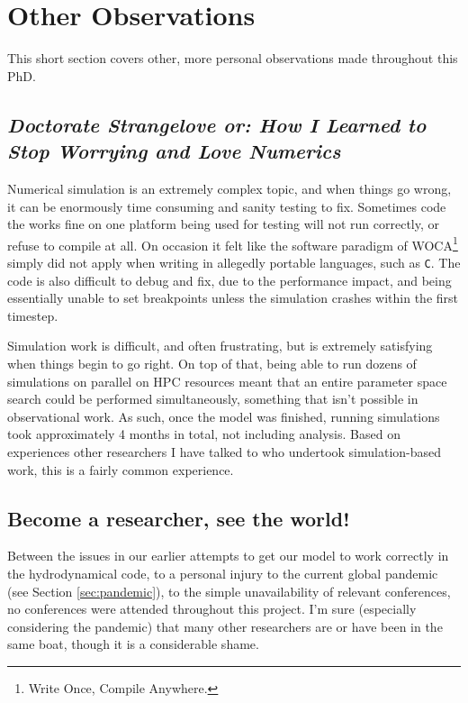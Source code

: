 \section{Other Observations}

This short section covers other, more personal observations made throughout this PhD.

\subsection[\textit{How I Learned to Stop Worrying and Love Numerics}]{\textit{Doctorate Strangelove or: How I Learned to Stop Worrying and Love Numerics}}

Numerical simulation is an extremely complex topic, and when things go wrong, it can be enormously time consuming and sanity testing to fix.
Sometimes code the works fine on one platform being used for testing will not run correctly, or refuse to compile at all.
On occasion it felt like the software paradigm of WOCA\footnote{Write Once, Compile Anywhere.} simply did not apply when writing in allegedly portable languages, such as \texttt{C}.
The code is also difficult to debug and fix, due to the performance impact, and being essentially unable to set breakpoints unless the simulation crashes within the first timestep.

Simulation work is difficult, and often frustrating, but is extremely satisfying when things begin to go right.
On top of that, being able to run dozens of simulations on parallel on HPC resources meant that an entire parameter space search could be performed simultaneously, something that isn't possible in observational work.
As such, once the model was finished, running simulations took approximately 4 months in total, not including analysis.
Based on experiences other researchers I have talked to who undertook simulation-based work, this is a fairly common experience.

\subsection{Become a researcher, see the world!}

Between the issues in our earlier attempts to get our model to work correctly in the \mg{} hydrodynamical code, to a personal injury to the current global pandemic
(see Section \ref{sec:pandemic}), to the simple unavailability of relevant conferences, no conferences were attended throughout this project.
I'm sure (especially considering the pandemic) that many other researchers are or have been in the same boat, though it is a considerable shame.

